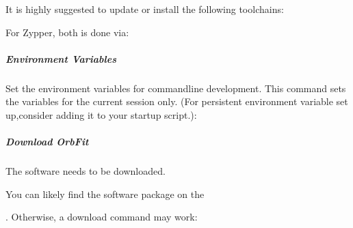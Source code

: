 \documentclass[letterpaper,11pt,english]{sphinxmanual}
\begin{document}
\sphinxAtStartPar
It is highly suggested to update or install the following toolchains:

\begin{sphinxVerbatim}[commandchars=\\\{\}]
  
    
   
\end{sphinxVerbatim}

\sphinxAtStartPar
For Zypper, both is done via:

\begin{sphinxVerbatim}[commandchars=\\\{\}]
   
   
  
    
    
\end{sphinxVerbatim}


\subparagraph{Environment Variables}
\label{\detokenize{technical/installation/orbfit:environment-variables}}
\sphinxAtStartPar
Set the environment variables for command\sphinxhyphen{}line development. This command sets
the variables for the current session only. (For persistent environment
variable set up,consider adding it to your startup script.):

\begin{sphinxVerbatim}[commandchars=\\\{\}]
 
\end{sphinxVerbatim}


\subparagraph{Download OrbFit}
\label{\detokenize{technical/installation/orbfit:download-orbfit}}
\sphinxAtStartPar
The software needs to be downloaded.

\sphinxAtStartPar
You can likely find the software package on the %
\begin{footnote}[38]\sphinxAtStartFootnote
{}
%
\end{footnote}. Otherwise,
a download command may work:
\end{document}
